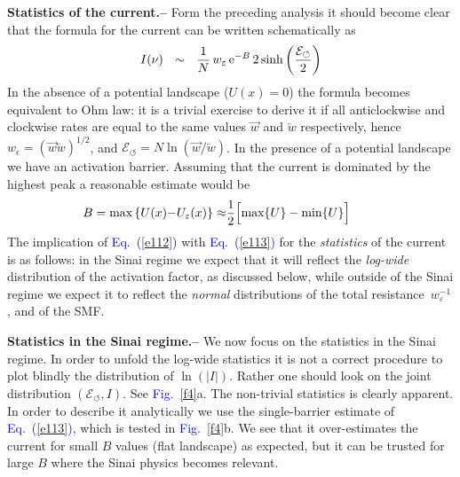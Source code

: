 \documentclass[aps,prl,floats,floatfix,twocolumn]{revtex4}
\newcommand{\eexp}{\mbox{e}^}
\newcommand{\mylabel}[1]{\label{#1}}
\newcommand{\eeq}{\end{eqnarray}}
\newcommand{\be}[1]{\begin{eqnarray}\ifthenelse{#1=-1}
{\nonumber}{\ifthenelse{#1=0}{}{\mylabel{e#1}}}}
\newcommand{\sect}[1]{{\bf #1.-- }}
\newcommand{\Eq}[1]{\textcolor{blue}{Eq.\!\!~(\ref{#1})}}
\newcommand{\Fig}[1]{\textcolor{blue}{Fig.}\!\!~\ref{#1}}
\begin{document}
\sect{Statistics of the current}
%
%
Form the preceding analysis it should become clear that 
the formula for the current can be written schematically as 
%
\be{112}
I(\nu) \ \ \sim \ \  \frac{1}{N} \, w_{\varepsilon} \, \eexp{-B} \, 2\sinh\left(\frac{\mathcal{E}_{\circlearrowleft}}{2}\right)
\eeq
%
In the absence of a potential landscape ($U(x)=0$) the formula becomes equivalent to Ohm law: 
it is a trivial exercise to derive it if all anticlockwise and clockwise rates are equal 
to the same values $\overrightarrow{w}$ and $\overleftarrow{w}$ respectively, 
hence $w_{\epsilon}=(\overrightarrow{w} \overleftarrow{w})^{1/2}$, 
and ${\mathcal{E}_{\circlearrowleft}=N\ln(\overrightarrow{w}/\overleftarrow{w})}$.   
In the presence of a potential landscape we have an activation barrier.
Assuming that the current is dominated by the highest peak 
a reasonable estimate would be
%
\be{113}
B = \text{max}\left\{ U(x){-}U_{\varepsilon}(x) \right\} 
\approx& \frac{1}{2} \Big[ \text{max}\{U\} - \text{min}\{U\} \Big] \ \ \ \ 
\eeq 
%
The implication of \Eq{e112} with \Eq{e113} for the {\em statistics} of the current 
is as follows: in the Sinai regime we expect that it will reflect 
the {\em log-wide} distribution of the activation factor, as discussed below, 
while outside of the Sinai regime we expect it to reflect the {\em normal} distributions 
of the total resistance~$w_{\varepsilon}^{-1}$, and of the SMF.  


\sect{Statistics in the Sinai regime}
%
We now focus on the statistics in the Sinai regime. 
In order to unfold the log-wide statistics it is 
not a correct procedure to plot blindly the distribution 
of $\ln(|I|)$. Rather one should look on the joint 
distribution ${(\mathcal{E}_{\circlearrowleft},I)}$. 
See \Fig{f4}a. The non-trivial statistics is clearly apparent.
In order to describe it analytically we use 
the single-barrier estimate of \Eq{e113}, 
which is tested in \Fig{f4}b. We see that it 
over-estimates the current for small $B$ values 
(flat landscape) as expected, but it can be trusted 
for large $B$ where the Sinai physics becomes relevant. 
\end{document}
